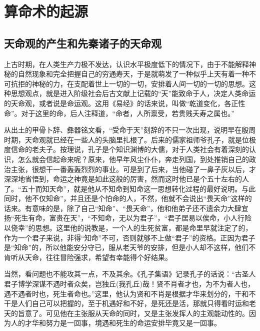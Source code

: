 \chapter{算命术的起源}
\section{天命观的产生和先秦诸子的天命观}
上古时期，在人类生产力极不发达，认识水平极度低下的情况下，由于不能解释神秘的自然现象和完全把握自己的穷通寿天，于是就萌发了一种似乎上天有着一种不可抗拒的神秘的力，在支配着世上一切的一切，安排着人间一切的一切的思想。这种思想观点，就是进入阶级社会后古文献上记载的“天”能致命于人，决定人类命运的天命观，或者说是命运观。这用《易经》的话来说，叫做“乾道变化，各正性命”。对于这里的命，后人注释道，“命者，人所禀受，若贵贱夭寿之属也。”


从出土的甲骨卜辞、彝器铭文看，“受命于天”刻辞的不只一次出现，说明早在殷周时期，天命观就已经在一些人的头脑里扎根了。后来的儒家祖师爷孔子，就是位极度信命的老夫子。按理说，孔子是个知识渊博的大儒，对于人类社会有着深刻的认识，怎么就会信起命来呢？原来，他早年风尘仆仆，奔走列国，到处推销自己的政治主张，很想干一番轰轰烈烈的事业。可是到了后来，当他碰了一鼻子灰以后，才深深地省悟到，命运之神竟是如此这般的厉害，然而这时他已是个五十左右的人了。“五十而知天命”，就是他从不知命到知命这一思想转化过程的最好说明。与此同时，他不仅知命”，并且还是个怕命的人，不然，他就不会说出“畏天命”这样的话来。有意味的是，除了自己“知命”、“畏天命”，他和他弟子还不遗余力大肆宜扬“死生有命，富贵在天”，“不知命，无以为君子”，“君子居易以俟命，小人行险以侥幸”的思想。这里他的说教是，一个人的生死贫富，都是命里早就注定了的，作为一个君子来说，非得“知命”不可，否则就够不上做“君子”的资格。正因为君子是“知命”的，所以他能安分守已，服从老天爷的安排，但是小人却不这样，他们不肯听从天命，往往冒险强求，希望有幸能得个好结果。


当然，看问题也不能攻其一点，不及其余。《孔子集语》记录孔子的话说：“古圣人君子博学深谋不遇时者众矣，岂独丘(我孔丘)哉！贤不肖者才也，为不为者人也，遇不遇者时也，死生者命也。”这里，他认为贤和不肖是根据才华来划分的，干和不干是人们自己可以把握的，至于机遇好和不好，是死还是活，那就只得看时运和老天的旨意了。可见他在主张服从天命的同时，又是主张发挥人的主观能动性的。因为人的才华和努力是一回事，境遇和死生的命运安排毕竟又是一回事。